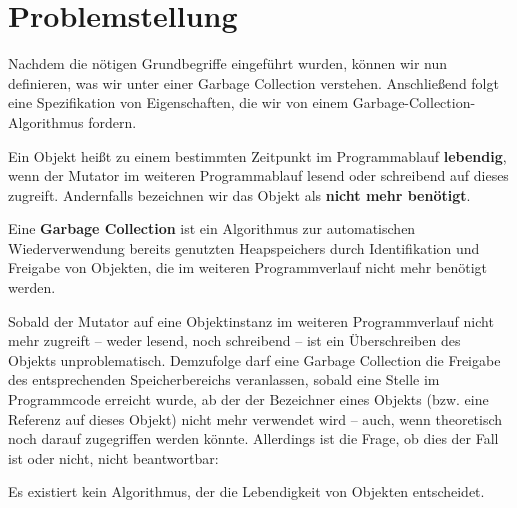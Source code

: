 

\section{Problemstellung}
\label{sec:intro:problem}
Nachdem die nötigen Grundbegriffe eingeführt wurden, können wir nun definieren, was wir unter einer Garbage Collection verstehen.
Anschließend folgt eine Spezifikation von Eigenschaften, die wir von einem Garbage-Collection-Algorithmus fordern.

\begin{mybox}
\begin{defn}[Lebendigkeit]
	\label{def:liveness}
	Ein Objekt heißt zu einem bestimmten Zeitpunkt im Programmablauf \textbf{lebendig}, wenn der Mutator im weiteren Programmablauf lesend oder schreibend auf dieses zugreift.
	Andernfalls bezeichnen wir das Objekt als \textbf{nicht mehr benötigt}.
\end{defn}
\end{mybox}

\begin{mybox}
\begin{defn}
	\label{def:gc}
	Eine \textbf{Garbage Collection} ist ein Algorithmus zur automatischen Wiederverwendung bereits genutzten Heapspeichers durch Identifikation und Freigabe von Objekten, die im weiteren Programmverlauf nicht mehr benötigt werden.
\end{defn}
\end{mybox}

Sobald der Mutator auf eine Objektinstanz im weiteren Programmverlauf nicht mehr zugreift -- weder lesend, noch schreibend -- ist ein Überschreiben des Objekts unproblematisch.
Demzufolge darf eine Garbage Collection die Freigabe des entsprechenden Speicherbereichs veranlassen, sobald eine Stelle im Programmcode erreicht wurde, ab der der Bezeichner eines Objekts (bzw. eine Referenz auf dieses Objekt) nicht mehr verwendet wird -- auch, wenn theoretisch noch darauf zugegriffen werden könnte.
Allerdings ist die Frage, ob dies der Fall ist oder nicht, nicht beantwortbar:

\begin{mybox}
\begin{satz}
	Es existiert kein Algorithmus, der die Lebendigkeit von Objekten entscheidet.
\end{satz}
\end{mybox}

